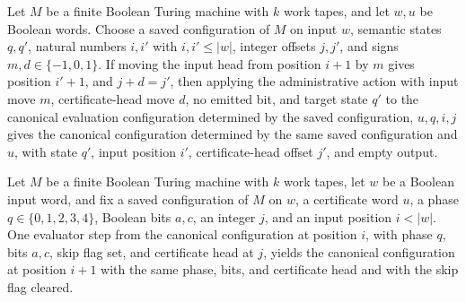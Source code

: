 \begin{lemma}
\label{Complexity.satEvalAction_apply}
\leanok
{}
Let $M$ be a finite Boolean Turing machine with $k$ work tapes, and let $w,u$ be Boolean
words. Choose a saved configuration of $M$ on input $w$, semantic states $q,q'$, natural
numbers $i,i'$ with $i,i'\le |w|$, integer offsets $j,j'$, and signs $m,d\in\{-1,0,1\}$.
If moving the input head from position $i+1$ by $m$ gives position $i'+1$, and $j+d=j'$,
then applying the administrative action with input move $m$, certificate-head move $d$,
no emitted bit, and target state $q'$ to the canonical evaluation configuration
determined by the saved configuration, $u,q,i,j$ gives the canonical configuration
determined by the same saved configuration and $u$, with state $q'$, input position
$i'$, certificate-head offset $j'$, and empty output.
\end{lemma}

\begin{lemma}
\label{Complexity.satEval_skip}
\leanok
{}
Let $M$ be a finite Boolean Turing machine with $k$ work tapes, let $w$ be a Boolean
input word, and fix a saved configuration of $M$ on $w$, a certificate word $u$, a phase
$q\in\{0,1,2,3,4\}$, Boolean bits $a,c$, an integer $j$, and an input position $i<|w|$.
One evaluator step from the canonical configuration at position $i$, with phase $q$,
bits $a,c$, skip flag set, and certificate head at $j$, yields the canonical
configuration at position $i+1$ with the same phase, bits, and certificate head and with
the skip flag cleared.
\end{lemma}

